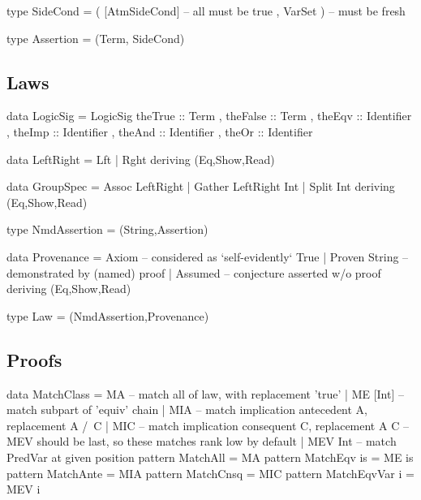 \begin{code}
type SideCond = ( [AtmSideCond]  -- all must be true
                , VarSet )       -- must be fresh
\end{code}

\begin{code}
type Assertion = (Term, SideCond)
\end{code}

\newpage
\subsection{Laws}

\begin{code}
data LogicSig
  = LogicSig
     { theTrue  :: Term
     , theFalse :: Term
     , theEqv   :: Identifier
     , theImp   :: Identifier
     , theAnd   :: Identifier
     , theOr    :: Identifier
     }
\end{code}

\begin{code}
data LeftRight = Lft | Rght deriving (Eq,Show,Read)

data GroupSpec
  = Assoc LeftRight
  | Gather LeftRight Int
  | Split Int
  deriving (Eq,Show,Read)
\end{code}

\begin{code}
type NmdAssertion = (String,Assertion)
\end{code}

\begin{code}
data Provenance
  = Axiom          --  considered as `self-evidently` True
  | Proven String  --  demonstrated by (named) proof
  | Assumed        --  conjecture asserted w/o proof
  deriving (Eq,Show,Read)
\end{code}

\begin{code}
type Law = (NmdAssertion,Provenance)
\end{code}

\newpage
\subsection{Proofs}

\begin{code}
data MatchClass
  = MA       -- match all of law, with replacement 'true'
  | ME [Int] -- match subpart of 'equiv' chain
  | MIA      -- match implication antecedent A, replacement A /\ C
  | MIC      -- match implication consequent C, replacement A \/ C
  -- MEV should be last, so these matches rank low by default
  | MEV Int  -- match PredVar at given position
pattern MatchAll       = MA
pattern MatchEqv is    = ME is
pattern MatchAnte      = MIA
pattern MatchCnsq      = MIC
pattern MatchEqvVar i  = MEV i
\end{code}

